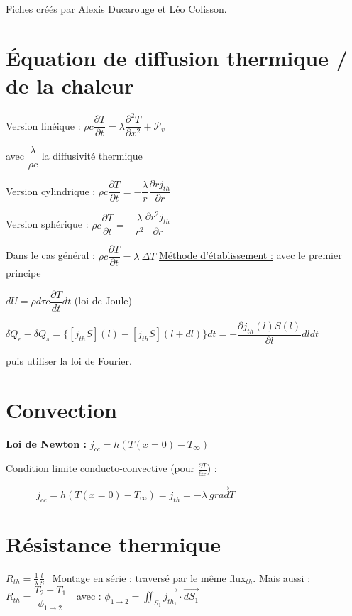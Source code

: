 \documentclass[9pt,twocolumn]{article}
\begin{document}
\footnotesize{Fiches créés par Alexis Ducarouge et Léo Colisson.}

\section{Équation de diffusion thermique / de la chaleur}
\begin{center}

Version linéique : $\boxed{ \rho c\dfrac{\partial T}{\partial t}=\lambda\dfrac{\partial^2 T}{\partial x^2}+\mathscr{P}_{v}}$ 
\end{center}

avec $\dfrac{\lambda}{\rho c}$ la diffusivité thermique

Version cylindrique : $ \rho c\dfrac{\partial T}{\partial t}=-\dfrac{\lambda}{r}\dfrac{\partial r j_{th}}{\partial r}$

Version sphérique : $ \rho c\dfrac{\partial T}{\partial t}=-\dfrac{\lambda}{r^2}\dfrac{\partial r^2 j_{th} }{\partial r}$

Dans le cas général : $\boxed{\rho c\dfrac{\partial T}{\partial t}=\lambda \>\Delta T}$
\medbreak
\underline{Méthode d'établissement :} avec le premier principe 

$dU=\rho d\tau c \dfrac{\partial T}{dt}dt$ (loi de Joule)

$\delta Q_e-\delta Q_s=\lbrace[j_{th}S](l)-[j_{th}S](l+dl)\rbrace dt=-\dfrac{\partial j_{th}(l)S(l)}{\partial l}dldt$

puis utiliser la loi de Fourier.

\section{Convection}

\textbf{Loi de Newton :} $\boxed{j_{cc}=h(T(x=0)-T_{\infty})}$

\smallbreak
Condition limite conducto-convective (pour $\frac{\partial T}{\partial x}$) :

$\>\>\>\>\>\>\>\>\>\>\>\>\>\>j_{cc}=h(T(x=0)-T_{\infty})=j_{th}=-\lambda\>\overrightarrow{grad}T$

\section{Résistance thermique}

$\boxed{R_{th}=\frac{1}{\lambda}\frac{l}{S}}\>\>$ Montage en série : traversé par le même flux$_{th}$.
\smallbreak
Mais aussi : $\boxed{R_{th}=\dfrac{T_2-T_1}{\phi_{1\rightarrow 2}}}\>\>\>$ avec : $\displaystyle{\phi_{1\rightarrow 2}= \iint _{S_1} \overrightarrow{j_{th_1}}\cdot\overrightarrow{dS_1}}$


\end{document}
